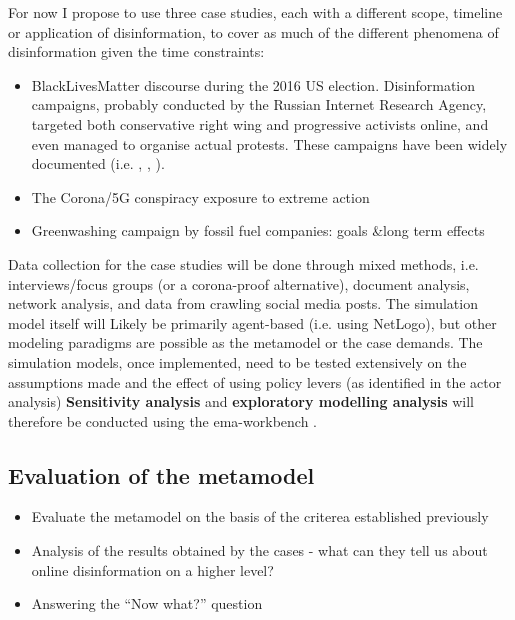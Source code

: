 For now I propose to use three case studies, each with a different scope, timeline or application of disinformation, to cover as much of the different phenomena of disinformation given the time constraints:
\begin{itemize}
	\item BlackLivesMatter discourse during the 2016 US election. Disinformation campaigns, probably conducted by the Russian Internet Research Agency, targeted both conservative right wing and progressive activists online, and even managed to organise actual protests. These campaigns have been widely documented (i.e. \cite{Frenkel2018}, \cite{Arif2018}, \cite{SCI2019}).
	\item The Corona/5G conspiracy exposure to extreme action
	\item Greenwashing campaign by fossil fuel companies: goals \&long term effects
\end{itemize}

Data collection for the case studies will be done through mixed methods, i.e. interviews/focus groups (or a corona-proof alternative), document analysis, network analysis, and data from crawling social media posts. The simulation model itself will Likely be primarily agent-based (i.e. using NetLogo), but other modeling paradigms are possible as the metamodel or the case demands. The simulation models, once implemented, need to be tested extensively on the assumptions made and the effect of using policy levers (as identified in the actor analysis) \textbf{Sensitivity analysis} and \textbf{exploratory modelling analysis} will therefore be conducted using the ema-workbench \citep{Kwakkel2017}.



\subsection{Evaluation of the metamodel}
\begin{itemize}
	\item Evaluate the metamodel on the basis of the criterea established previously
	\item Analysis of the results obtained by the cases - what can they tell us about online disinformation on a higher level?
	\item Answering the ``Now what?'' question
\end{itemize}
